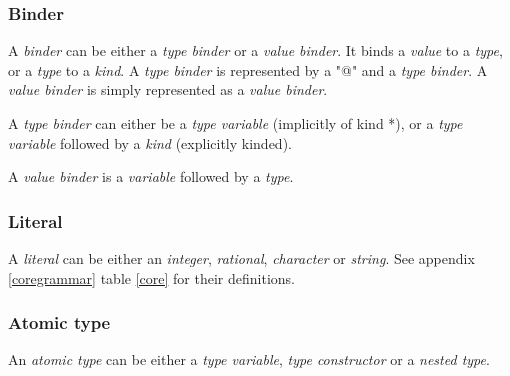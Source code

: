 \subsubsection{Binder}

A \emph{binder} can be either a \emph{type binder} or a \emph{value binder}. It binds
a \emph{value} to a \emph{type}, or a \emph{type} to a \emph{kind}.
A \emph{type binder} is represented by a "@" and a \emph{type binder}.
A \emph{value binder} is simply represented as a \emph{value binder}.





A \emph{type binder} can either be a \emph{type variable} (implicitly of kind *), or a 
\emph{type variable} followed by a \emph{kind} (explicitly kinded).








A \emph{value binder} is a \emph{variable} followed by a \emph{type}.\cite{tolmach2010ghc}





\subsubsection{Literal}

A \emph{literal} can be either an \emph{integer}, \emph{rational}, \emph{character} 
or \emph{string}. See appendix \ref{coregrammar} table \ref{core} for their definitions.\cite{tolmach2010ghc}






\subsubsection{Atomic type}

An \emph{atomic type} can be either a \emph{type variable}, \emph{type constructor} 
or a \emph{nested type}.\cite{tolmach2010ghc}





